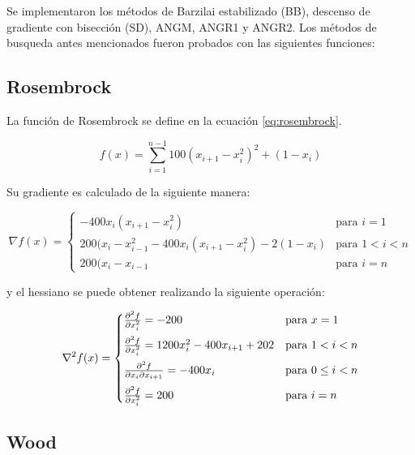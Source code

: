 Se implementaron los métodos de Barzilai estabilizado (BB), descenso de gradiente con bisección (SD), ANGM, ANGR1 y ANGR2. Los métodos de busqueda antes mencionados fueron probados con las siguientes funciones:

\subsection*{Rosembrock}

La función de Rosembrock se define en la ecuación \ref{eq:rosembrock}.

\begin{equation}
    f(x) = \sum_{i=1}^{n-1}  100(x_{i+1}-x_{i}^2)^2 +(1-x_i)
    \label{eq:rosembrock}
\end{equation}

Su gradiente es calculado de la siguiente manera:

\begin{equation}
    \nabla f (x) =\begin{cases}
        -400x_i(x_{i+1}-x_{i}^2)                              & \text{para } i=1   \\[0.25cm]
        200(x_{i}-x_{i-1}^2-400x_i(x_{i+1}-x_{i}^2) -2(1-x_i) & \text{para } 1<i<n \\[0.25cm]
        200(x_{i}-x_{i-1}                                     & \text{para } i=n
    \end{cases} \label{eq:rosembrock_gradient}
\end{equation}


y el hessiano se puede obtener realizando la siguiente operación:

\begin{equation}
    \nabla^2 f(x)  = \begin{cases}
        \frac{\partial^2 f}{\partial x_i^2} = -200                    & \text{para } x=1         \\[0.25cm]
        \frac{\partial^2 f}{\partial x_i^2} =1200x_i^2-400x_{i+1}+202 & \text{para } 1<i<n       \\[0.25cm]
        \frac{\partial^2 f}{\partial x_i \partial x_{i+1}}  = -400x_i       & \text{para } 0\leq i < n \\[0.25cm]
        \frac{\partial^2 f}{\partial x_i^2} = 200                     & \text{para } i=n
    \end{cases}
    \label{eq:rosembrock_hessian}
\end{equation}

\subsection*{Wood}

